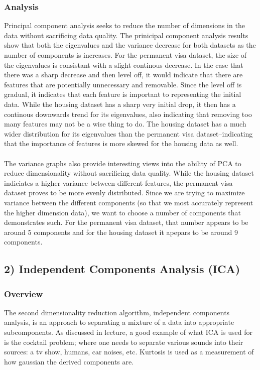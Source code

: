 \documentclass[h]{article}
\begin{document}
\subsubsection*{Analysis}
Principal component analysis seeks to reduce the number of dimensions in the data without sacrificing data quality.  The prinicipal component analysis results show that both the eigenvalues and the variance decrease for 
both datasets as the number of components is increases.  For the permanent visa 
dataset, the size of the eigenvalues is consistant with a slight continous decrease.  In the case that there was a sharp decrease and then level off,
it would indicate that there are features that are potentially unnecessary and removable.  Since the level off is gradual, 
it indicates that each feature is important to representing the initial data.  While the housing 
dataset has a sharp very initial drop, it then has a continous downwards trend for its eigenvalues, 
also indicating that removing too many features may not be a wise thing to do.  
The housing dataset has a much wider distribution for its eigenvalues than the 
permanent visa dataset--indicating that the importance of features is more 
skewed for the housing data as well.
\\ \\
The variance graphs also provide interesting views into the ability of PCA to reduce 
dimensionality without sacrificing data quality.  While the housing dataset 
indiciates a higher variance between different features, the permanent visa 
dataset proves to be more evenly distributed.  Since we are trying to maximize 
variance between the different components (so that we most accurately represent the higher dimension 
data), we want to choose a number of components that demonstrates such.  For 
the permanent visa dataset, that number appears to be around 5 components and for 
the housing dataset it apepars to be around 9 components.

\subsection*{2) Independent Components Analysis (ICA)}  
\subsubsection*{Overview}
The second dimensionality reduction algorithm, independent components analysis, 
is an approach to separating a mixture of a data into appropriate subcomponents. 
 As discussed in lecture, a good example of what ICA is used for is the cocktail problem; where one needs to 
 separate various sounds into their sources: a tv show, humans, car noises, etc.  
  Kurtosis is used as a measurement of how gaussian the derived components 
  are.
  
\end{document}
